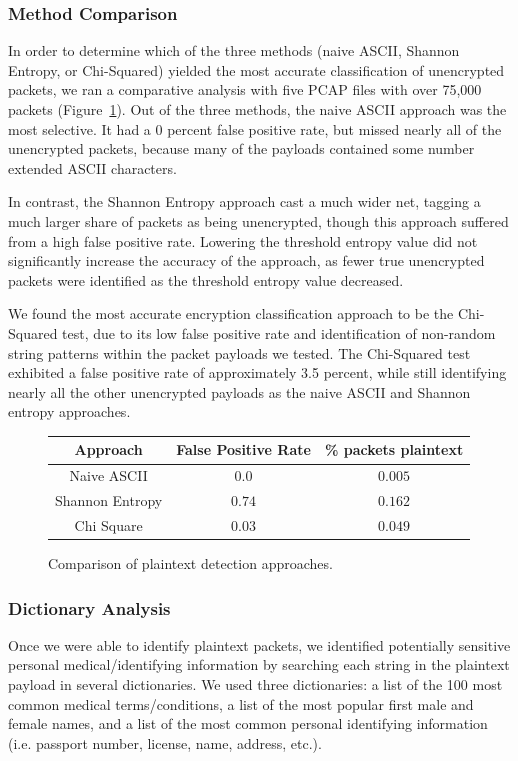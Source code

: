 \subsubsection{Method Comparison}
In order to determine which of the three methods (naive ASCII, Shannon Entropy, or Chi-Squared) yielded the most accurate classification of unencrypted packets, we ran a comparative analysis with five PCAP files with over 75,000 packets (Figure~\ref{fig:method-comp}). Out of the three methods, the naive ASCII approach was the most selective. It had a 0 percent false positive rate, but missed nearly all of the unencrypted packets, because many of the payloads contained some number extended ASCII characters. 

In contrast, the Shannon Entropy approach cast a much wider net, tagging a much larger share of packets as being unencrypted, though this approach suffered from a high false positive rate. Lowering the threshold entropy value did not significantly increase the accuracy of the approach, as fewer true unencrypted packets were identified as the threshold entropy value decreased. 

We found the most accurate encryption classification approach to be the Chi-Squared test, due to its low false positive rate and identification of non-random string patterns within the packet payloads we tested. The Chi-Squared test exhibited a false positive rate of approximately 3.5 percent, while still identifying nearly all the other unencrypted payloads as the naive ASCII and Shannon entropy approaches.


\begin{figure}
  \begin{center}
    \begin{tabular}{c|c|c} 
    \textbf{Approach} & \textbf{False Positive Rate} & \textbf{\% packets plaintext}\\ [0.5ex] 
    \hline
    Naive ASCII & $0.0$ & $0.005$ \\ 
    Shannon Entropy &  $0.74$ & $0.162$ \\
    Chi Square & $0.03$ & $0.049$ \\
    \end{tabular}
    \caption{Comparison of plaintext detection approaches.}
    \label{fig:method-comp}
  \end{center}
\end{figure}

\subsubsection{Dictionary Analysis}
Once we were able to identify plaintext packets, we identified potentially sensitive personal medical/identifying information by searching each string in the plaintext payload in several dictionaries. We used three dictionaries: a list of the 100 most common medical terms/conditions, a list of the most popular first male and female names, and a list of the most common personal identifying information (i.e. passport number, license, name, address, etc.). 


